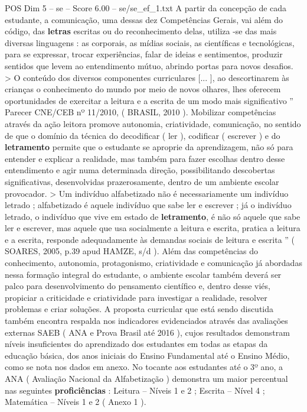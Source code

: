 \begin{textsample}{POS Dim 5 – se – Score 6.00 – se/se\_ef\_1.txt}
A partir da concepção de cada estudante, a comunicação, uma dessas dez Competências Gerais, vai além do código, das \textbf{letras} escritas ou do reconhecimento delas, utiliza -se das mais diversas linguagens : as corporais, as mídias sociais, as científicas e tecnológicas, para se expressar, trocar experiências, falar de ideias e sentimentos, produzir sentidos que levem ao entendimento mútuo, abrindo portas para novos desafios. > O conteúdo dos diversos componentes curriculares [... ], ao descortinarem às crianças o conhecimento do mundo por meio de novos olhares, lhes oferecem oportunidades de exercitar a leitura e a escrita de um modo mais significativo ” Parecer CNE/CEB nº 11/2010, ( BRASIL, 2010 ).
Mobilizar competências através da ação leitora promove autonomia, criatividade, comunicação, no sentido de que o domínio da técnica do decodificar ( ler ), codificar ( escrever ) e do \textbf{letramento} permite que o estudante se aproprie da aprendizagem, não só para entender e explicar a realidade, mas também para fazer escolhas dentro desse entendimento e agir numa determinada direção, possibilitando descobertas significativas, desenvolvidas prazerosamente, dentro de um ambiente escolar provocador. > Um indivíduo alfabetizado não é necessariamente um indivíduo letrado ; alfabetizado é aquele indivíduo que sabe ler e escrever ; já o indivíduo letrado, o indivíduo que vive em estado de \textbf{letramento}, é não só aquele que sabe ler e escrever, mas aquele que usa socialmente a leitura e escrita, pratica a leitura e a escrita, responde adequadamente às demandas sociais de leitura e escrita ” ( SOARES, 2005, p.39 apud HAMZE, s/d ).
Além das competências do conhecimento, autonomia, protagonismo, criatividade e comunicação já abordadas nessa formação integral do estudante, o ambiente escolar também deverá ser palco para desenvolvimento do pensamento científico e, dentro desse viés, propiciar a criticidade e criatividade para investigar a realidade, resolver problemas e criar soluções.
A proposta curricular que está sendo discutida também encontra respalda nos indicadores evidenciados através das avaliações externas SAEB ( ANA e Prova Brasil até 2016 ), cujos resultados demonstram níveis insuficientes do aprendizado dos estudantes em todas as etapas da educação básica, dos anos iniciais do Ensino Fundamental até o Ensino Médio, como se nota nos dados em anexo.
No tocante aos estudantes até o 3º ano, a ANA ( Avaliação Nacional da Alfabetização ) demonstra um maior percentual nas seguintes \textbf{proficiências} : Leitura – Níveis 1 e 2 ; Escrita – Nível 4 ; Matemática – Níveis 1 e 2 ( Anexo 1 ).

\end{textsample}
